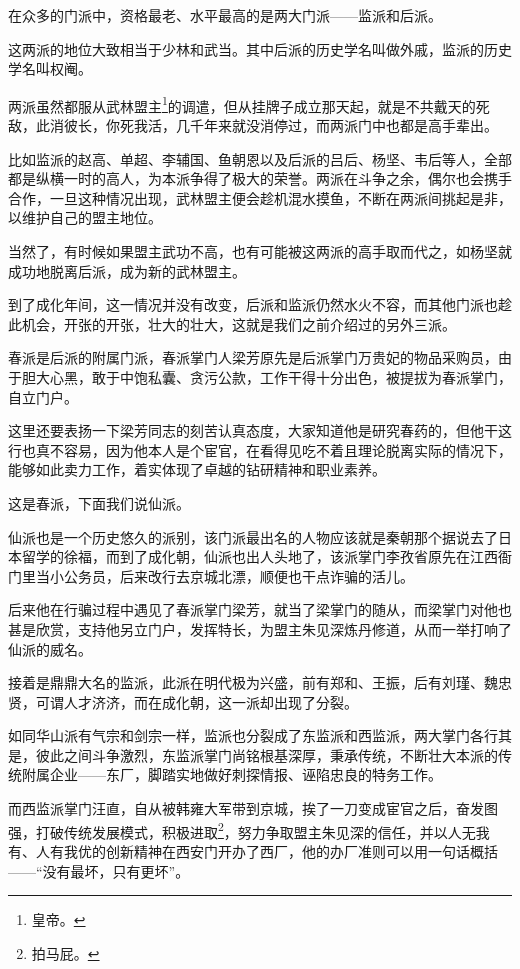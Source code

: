 \begin{multicols}{\theparacolNo}
		在众多的门派中，资格最老、水平最高的是两大门派——监派和后派。

		这两派的地位大致相当于少林和武当。其中后派的历史学名叫做外戚，监派的历史学名叫权阉。

		两派虽然都服从武林盟主\footnote{皇帝。}的调遣，但从挂牌子成立那天起，就是不共戴天的死敌，此消彼长，你死我活，几千年来就没消停过，而两派门中也都是高手辈出。

		比如监派的赵高、单超、李辅国、鱼朝恩以及后派的吕后、杨坚、韦后等人，全部都是纵横一时的高人，为本派争得了极大的荣誉。两派在斗争之余，偶尔也会携手合作，一旦这种情况出现，武林盟主便会趁机混水摸鱼，不断在两派间挑起是非，以维护自己的盟主地位。

		当然了，有时候如果盟主武功不高，也有可能被这两派的高手取而代之，如杨坚就成功地脱离后派，成为新的武林盟主。

		到了成化年间，这一情况并没有改变，后派和监派仍然水火不容，而其他门派也趁此机会，开张的开张，壮大的壮大，这就是我们之前介绍过的另外三派。

		春派是后派的附属门派，春派掌门人梁芳原先是后派掌门万贵妃的物品采购员，由于胆大心黑，敢于中饱私囊、贪污公款，工作干得十分出色，被提拔为春派掌门，自立门户。

		这里还要表扬一下梁芳同志的刻苦认真态度，大家知道他是研究春药的，但他干这行也真不容易，因为他本人是个宦官，在看得见吃不着且理论脱离实际的情况下，能够如此卖力工作，着实体现了卓越的钻研精神和职业素养。

		这是春派，下面我们说仙派。

		仙派也是一个历史悠久的派别，该门派最出名的人物应该就是秦朝那个据说去了日本留学的徐福，而到了成化朝，仙派也出人头地了，该派掌门李孜省原先在江西衙门里当小公务员，后来改行去京城北漂，顺便也干点诈骗的活儿。

		后来他在行骗过程中遇见了春派掌门梁芳，就当了梁掌门的随从，而梁掌门对他也甚是欣赏，支持他另立门户，发挥特长，为盟主朱见深炼丹修道，从而一举打响了仙派的威名。

		接着是鼎鼎大名的监派，此派在明代极为兴盛，前有郑和、王振，后有刘瑾、魏忠贤，可谓人才济济，而在成化朝，这一派却出现了分裂。

		如同华山派有气宗和剑宗一样，监派也分裂成了东监派和西监派，两大掌门各行其是，彼此之间斗争激烈，东监派掌门尚铭根基深厚，秉承传统，不断壮大本派的传统附属企业——东厂，脚踏实地做好刺探情报、诬陷忠良的特务工作。

		而西监派掌门汪直，自从被韩雍大军带到京城，挨了一刀变成宦官之后，奋发图强，打破传统发展模式，积极进取\footnote{拍马屁。}，努力争取盟主朱见深的信任，并以人无我有、人有我优的创新精神在西安门开办了西厂，他的办厂准则可以用一句话概括——“没有最坏，只有更坏”。


\end{multicols}

